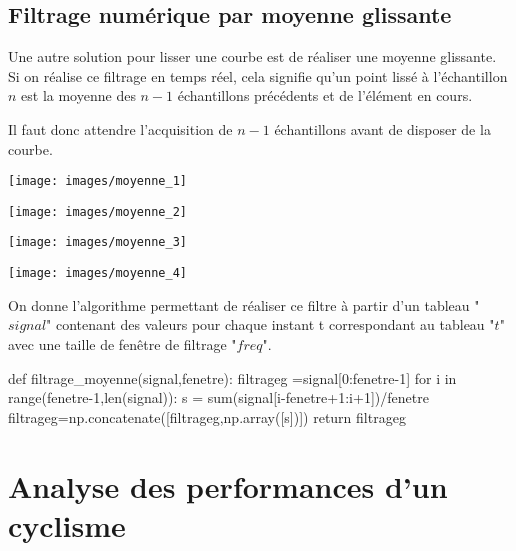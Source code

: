 \subsection{Filtrage numérique par moyenne glissante}
Une autre solution pour lisser une courbe est de réaliser une moyenne glissante. Si on réalise ce filtrage en temps réel, cela signifie qu'un point lissé à l'échantillon $n$ est la moyenne des $n-1$ échantillons précédents et de l'élément en cours. 

Il faut donc attendre l'acquisition de $n-1$ échantillons avant de disposer de la courbe.


\begin{minipage}[c]{.43\linewidth}
\begin{center}
\texttt{[image: images/moyenne\_1]}
\end{center}
\end{minipage} \hfill
\begin{minipage}[c]{.43\linewidth}
\begin{center}
\texttt{[image: images/moyenne\_2]}
\end{center}
\end{minipage} 

\begin{minipage}[c]{.43\linewidth}
\begin{center}
\texttt{[image: images/moyenne\_3]}
\end{center}
\end{minipage} \hfill
\begin{minipage}[c]{.43\linewidth}
\begin{center}
\texttt{[image: images/moyenne\_4]}
\end{center}
\end{minipage}

On donne l'algorithme permettant de réaliser ce filtre à partir d'un tableau "$signal$" contenant des valeurs pour chaque instant t correspondant au tableau "$t$" avec une taille de fenêtre de filtrage "$freq$".

\begin{pyverbatim}
def filtrage_moyenne(signal,fenetre):
    filtrageg =signal[0:fenetre-1]
    for i in range(fenetre-1,len(signal)):
        s = sum(signal[i-fenetre+1:i+1])/fenetre
        filtrageg=np.concatenate([filtrageg,np.array([s])])
    return filtrageg
\end{pyverbatim}


\section{Analyse des performances d'un cyclisme}

